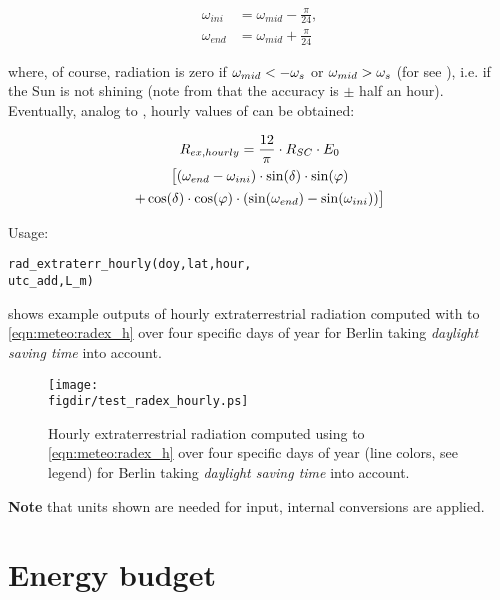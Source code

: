 \begin{equation}\label{eqn:meteo:radex_h:w_ini_end}
\begin{split}
\omega_{ini} &= \omega_{mid} - \frac{\pi}{24},\\
\omega_{end} &= \omega_{mid} + \frac{\pi}{24}
\end{split}
\end{equation}

\noindent
where, of course, radiation is zero if $\omega_{mid} < -\omega_{s}{}$ or $\omega_{mid} > \omega_{s}{}$ (for \dayTimeFac{} see ), i.e. if the Sun is not shining (note from  that the accuracy is $\pm$ half an hour). Eventually, analog to \radExtraterrDaily{}, hourly values of \radExtraterr{} can be obtained:

\begin{multline}\label{eqn:meteo:radex_h}
R_{ex,hourly}{} = \frac{12}{\pi} \cdot R_{SC}{} \cdot E_{0}{}\\
\big[ (\omega_{end}-\omega_{ini}) \cdot \sin(\delta{}) \cdot \sin(\varphi{})\\
+ \cos(\delta{}) \cdot \cos(\varphi{}) \cdot (\sin(\omega_{end})-\sin(\omega_{ini})) \big]
\end{multline}

\noindent
Usage:
\begin{verbatim}
rad_extraterr_hourly(doy,lat,hour,
utc_add,L_m)
\end{verbatim}

 shows example outputs of hourly extraterrestrial radiation computed with  to \ref{eqn:meteo:radex_h} over four specific days of year for Berlin taking \emph{daylight saving time} into account.

\begin{figure}
  \centering
  \texttt{[image: \\figdir/test\_radex\_hourly.ps]}
  \caption{Hourly extraterrestrial radiation computed using  to \ref{eqn:meteo:radex_h} over four specific days of year (line colors, see legend) for Berlin taking \emph{daylight saving time} into account.\label{fig:meteo:radex_h}}
\end{figure}

\textbf{Note} that units shown are needed for input, internal conversions are applied.


\section{Energy budget}

